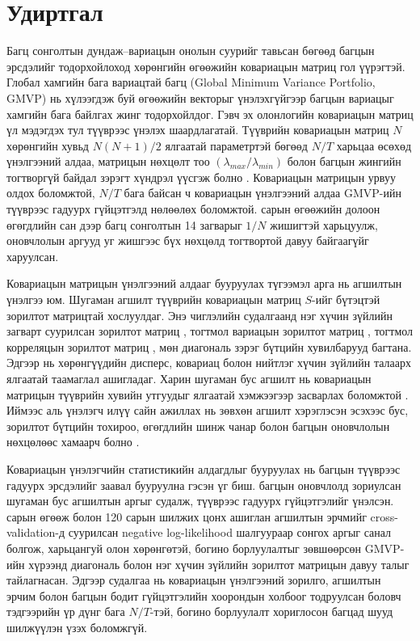 \section{Удиртгал}
\label{sec:introduction}

Багц сонголтын дундаж--вариацын онолын суурийг \citet{markowitz1952} тавьсан бөгөөд багцын эрсдэлийг тодорхойлоход хөрөнгийн өгөөжийн ковариацын матриц гол үүрэгтэй. Глобал хамгийн бага вариацтай багц (Global Minimum Variance Portfolio, GMVP) нь хүлээгдэж буй өгөөжийн векторыг үнэлэхгүйгээр багцын вариацыг хамгийн бага байлгах жинг тодорхойлдог. Гэвч эх олонлогийн ковариацын матриц үл мэдэгдэх тул түүврээс үнэлэх шаардлагатай. Түүврийн ковариацын матриц $N$ хөрөнгийн хувьд $N(N+1)/2$ ялгаатай параметртэй бөгөөд $N/T$ харьцаа өсөхөд үнэлгээний алдаа, матрицын нөхцөлт тоо $(\lambda_{max}/\lambda_{min})$ болон багцын жингийн тогтворгүй байдал зэрэгт хүндрэл үүсгэж болно \citep{ledoitwolf2004a}. Ковариацын матрицын урвуу олдох боломжтой, $N/T$ бага байсан ч ковариацын үнэлгээний алдаа GMVP-ийн түүврээс гадуурх гүйцэтгэлд нөлөөлөх боломжтой. \citet{demiguel2009} сарын өгөөжийн долоон өгөгдлийн сан дээр багц сонголтын 14 загварыг $1/N$ жишигтэй харьцуулж, оновчлолын аргууд уг жишгээс бүх нөхцөлд тогтвортой давуу байгаагүйг харуулсан.

Ковариацын матрицын үнэлгээний алдааг бууруулах түгээмэл арга нь агшилтын үнэлгээ юм. Шугаман агшилт түүврийн ковариацын матриц $S$-ийг бүтэцтэй зорилтот матрицтай хослуулдаг. Энэ чиглэлийн судалгаанд нэг хүчин зүйлийн загварт суурилсан зорилтот матриц \citep{ledoitwolf2003}, тогтмол вариацын зорилтот матриц \citep{ledoitwolf2004a}, тогтмол корреляцын зорилтот матриц \citep{ledoitwolf2004b}, мөн диагональ зэрэг бүтцийн хувилбарууд \citep{SchaferStrimmer2005,AndoXiao2023} багтана. Эдгээр нь хөрөнгүүдийн дисперс, ковариац болон нийтлэг хүчин зүйлийн талаарх ялгаатай таамаглал ашигладаг. Харин шугаман бус агшилт нь ковариацын матрицын түүврийн хувийн утгуудыг ялгаатай хэмжээгээр засварлах боломжтой \citep{ledoitwolf2012,ledoitwolf2020}. Иймээс аль үнэлэгч илүү сайн ажиллах нь зөвхөн агшилт хэрэглэсэн эсэхээс бус, зорилтот бүтцийн тохироо, өгөгдлийн шинж чанар болон багцын оновчлолын нөхцөлөөс хамаарч болно \citep{ledoitwolf2022}.

Ковариацын үнэлэгчийн статистикийн алдагдлыг бууруулах нь багцын түүврээс гадуурх эрсдэлийг заавал бууруулна гэсэн үг биш. \citet{ledoitwolf2017} багцын оновчлолд зориулсан шугаман бус агшилтын аргыг судалж, түүврээс гадуурх гүйцэтгэлийг үнэлсэн. \citet{shi2025} сарын өгөөж болон 120 сарын шилжих цонх ашиглан агшилтын эрчмийг cross-validation-д суурилсан negative log-likelihood шалгуураар сонгох аргыг санал болгож, харьцангуй олон хөрөнгөтэй, богино борлуулалтыг зөвшөөрсөн GMVP-ийн хүрээнд диагональ болон нэг хүчин зүйлийн зорилтот матрицын давуу талыг тайлагнасан. Эдгээр судалгаа нь ковариацын үнэлгээний зорилго, агшилтын эрчим болон багцын бодит гүйцэтгэлийн хоорондын холбоог тодруулсан боловч тэдгээрийн үр дүнг бага $N/T$-тэй, богино борлуулалт хориглосон багцад шууд шилжүүлэн үзэх боломжгүй.

